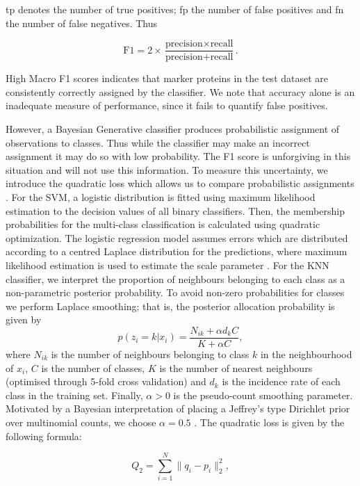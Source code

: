 \documentclass[12pt,english]{article}
\begin{document}
tp denotes the number of true positives; fp the number of
false positives and fn the number of false negatives. Thus

\[\text{F1}=2\times\frac{\text{precision}\times\text{recall}}{\text{precision}+\text{recall}}.\]

High Macro F1 scores indicates that marker proteins in the
test dataset are consistently correctly assigned by the
classifier. We note that accuracy alone is an inadequate
measure of performance, since it fails to quantify
false positives.

However, a Bayesian Generative classifier produces
probabilistic assignment of observations to classes. Thus
while the classifier may make an incorrect assignment it may
do so with low probability. The F1 score is unforgiving
in this situation and will not use this information.
To measure this uncertainty, we introduce the quadratic
loss which allows us to compare probabilistic assignments \citep{Gneiting:2007}.
For the SVM, a logistic distribution is fitted
using maximum likelihood estimation to the decision values of
all binary classifiers. Then, the membership probabilities for
the multi-class classification is calculated using quadratic optimization.
The logistic regression model assumes errors which are distributed according
to a centred Laplace distribution for the predictions,
where maximum likelihood estimation is used to estimate the
scale parameter \citep{Meyer:2017}.
For the KNN classifier, we interpret the proportion of neighbours
belonging to each class as a non-parametric posterior probability. To avoid
non-zero probabilities for classes we perform Laplace smoothing; that is, the
posterior allocation probability is given by
\begin{equation}
p(z_i = k|x_i) = \frac{N_{ik} + \alpha d_k C}{K + \alpha C},
\end{equation}
where $N_{ik}$ is the number of neighbours belonging to class $k$ in the
neighbourhood of $x_i$, $C$ is the number of classes, $K$ is the number of nearest
neighbours (optimised through 5-fold cross validation) and $d_k$ is the incidence
rate of each class in the training set. Finally, $\alpha >0$ is the
pseudo-count smoothing parameter. Motivated by a Bayesian interpretation of placing
a Jeffrey's type Dirichlet prior over multinomial counts, we choose $\alpha = 0.5$
\citep{Hazimeh:2015, Valcarce:2016, Manning:2008}.
The quadratic loss is given by the following formula:

\begin{equation}
  Q_2 = \sum_{i = 1}^{N}\lVert q_i - p_i\rVert_2^2,
\end{equation}
\end{document}
